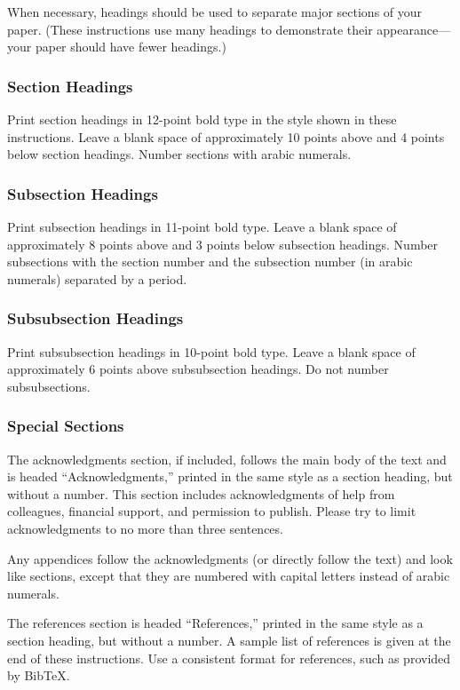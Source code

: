 \documentclass{article}
\begin{document}
When necessary, headings should be used to separate major sections of your
paper.
(These instructions use many headings to demonstrate their
appearance---your paper should have fewer headings.)

\subsubsection{Section Headings}

Print section headings in 12-point bold type in the style shown in these
instructions.  Leave a blank space of approximately 10 points above and 4
points below section headings.  Number sections with arabic numerals.

\subsubsection{Subsection Headings}

Print subsection headings in 11-point bold type.  Leave a blank space of
approximately 8 points above and 3 points below subsection headings.
Number subsections with the section number and the subsection number (in
arabic numerals) separated by a period.

\subsubsection{Subsubsection Headings}

Print subsubsection headings in 10-point bold type.  Leave a blank space of
approximately 6 points above subsubsection headings.  Do not number
subsubsections.

\subsubsection{Special Sections}
The acknowledgments section, if included, follows the main body of the text
and is headed ``Acknowledgments,'' printed in the same style as a section
heading, but without a number. 
This section includes acknowledgments of help from
colleagues, financial support, and permission to publish.  
Please try to limit acknowledgments to no more than three sentences.

Any appendices follow the acknowledgments (or directly follow the text) and
look like sections, except that they are numbered with capital letters
instead of arabic numerals. 

The references section is headed ``References,'' printed in the same
style as a section heading, but without a number.
A sample list of references is given at the end of these
instructions.
Use a consistent format for references, such as provided by
Bib\TeX{}.
\end{document}
